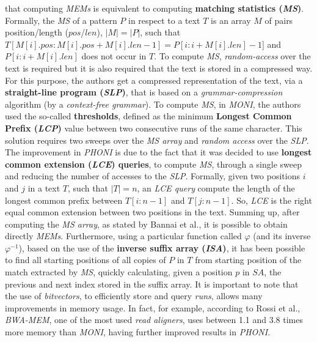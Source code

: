 \documentclass[a4paper,11pt, oneside]{article}
\begin{document}
that computing \textit{MEMs} is equivalent to computing \textbf{matching
  statistics (\textit{MS})}. Formally, the \textit{MS} of a pattern $P$ in
respect to a text $T$ is an array $M$ of pairs position/length ($pos$/$len$),
$|M|=|P|$, such that $T[M[i].pos:M[i].pos+M[i].len-1]=P[i:i+M[i].len]-1]$ and
$P[i:i+M[i].len]$ does not occur in $T$. To compute \textit{MS},
\textit{random-access} over the text is required  but it is also required that
the text is stored in a compressed way. For this purpose, the authors get a
compressed representation of the text, via a \textbf{straight-line program
(\textit{SLP})}, that is based on a \textit{grammar-compression} algorithm 
(by a \textit{context-free grammar}). To compute \textit{MS}, in \textit{MONI},
the authors used the so-called \textbf{thresholds}, defined as the minimum
\textbf{Longest Common Prefix (\textit{LCP})} value between two 
consecutive runs of the same character. This solution requires two sweeps over
the 
\textit{MS array} and \textit{random access} over the \textit{SLP}. The
improvement in \textit{PHONI} is due to the fact that it was decided to use
\textbf{longest common extension (\textit{LCE}) queries}, to compute
\textit{MS}, through a single sweep and reducing the number of accesses to the
\textit{SLP}. Formally, given two positions $i$ and $j$ in a 
text $T$, such that 
$|T|=n$, an \textit{LCE query} compute the length of the longest common prefix
between $T[i:n-1]$ and $T[j:n-1]$. So, \textit{LCE} is the right equal common
extension between two positions in the text. Summing up, after computing the
\textit{MS array}, as stated by Bannai et al., it is possible to obtain directly
\textit{MEMs}. Furthermore, using a particular
function called $\varphi$ (and its inverse $\varphi^{-1}$), based on the use
of the \textbf{inverse suffix array (\textit{ISA})}, it has been possible to
find all starting positions of all copies of $P$ in $T$ from starting position
of the match extracted by \textit{MS}, quickly calculating, given a position $p$
in $SA$, the previous and next index stored in the suffix array. It is important
to note that the use of \textit{bitvectors}, to efficiently store and query 
\textit{runs}, allows many improvements
in memory usage.  In fact, for example, according to Rossi et al., 
\textit{BWA-MEM}, one of the most used \textit{read aligners}, uses between 1.1
and 3.8 times more memory than \textit{MONI}, having further improved results in
\textit{PHONI}.  
\end{document}
